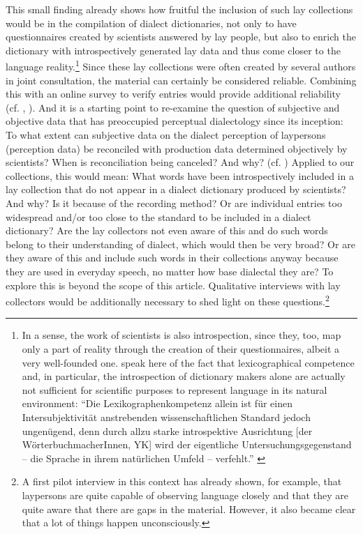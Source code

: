 \documentclass[output=paper]{langscibook}
\begin{document}
This small finding already shows how fruitful the inclusion of such lay collections would be in the compilation of dialect dictionaries, not only to have questionnaires created by scientists answered by lay people, but also to enrich the dictionary with introspectively generated lay data and thus come closer to the language reality.\footnote{In a sense, the work of scientists is also introspection, since they, too, map only a part of reality through the creation of their questionnaires, albeit a very well-founded one. \citet{HoferMeier2015} speak here of the fact that lexicographical competence and, in particular, the introspection of dictionary makers alone are actually not sufficient for scientific purposes to represent language in its natural environment: “Die Lexikographenkompetenz allein ist für einen Intersubjektivität anstrebenden wissenschaftlichen Standard jedoch ungenügend, denn durch allzu starke introspektive Ausrichtung [der WörterbuchmacherInnen, YK] wird der eigentliche Untersuchungsgegenstand – die Sprache in ihrem natürlichen Umfeld – verfehlt.” \citep[120]{HoferMeier2015}} Since these lay collections were often created by several authors in joint consultation, the material can certainly be considered reliable. Combining this with an online survey to verify entries would provide additional reliability (cf. \citealt{HoferMeier2015}, \citealt{Retti1999}). And it is a starting point to re-examine the question of subjective and objective data that has preoccupied perceptual dialectology since its inception: To what extent can subjective data on the dialect perception of laypersons (perception data) be reconciled with production data determined objectively by scientists? When is reconciliation being canceled? And why? (cf. \citealt{Preston1999}) Applied to our collections, this would mean: What words have been introspectively included in a lay collection that do not appear in a dialect dictionary produced by scientists? And why? Is it because of the recording method? Or are individual entries too widespread and/or too close to the standard to be included in a dialect dictionary? Are the lay collectors not even aware of this and do such words belong to their understanding of dialect, which would then be very broad? Or are they aware of this and include such words in their collections anyway because they are used in everyday speech, no matter how base dialectal they are? To explore this is beyond the scope of this article. Qualitative interviews with lay collectors would be additionally necessary to shed light on these questions.{\footnote{A first pilot interview in this context has already shown, for example, that laypersons are quite capable of observing language closely and that they are quite aware that there are gaps in the material. However, it also became clear that a lot of things happen unconsciously.}}
\end{document}
